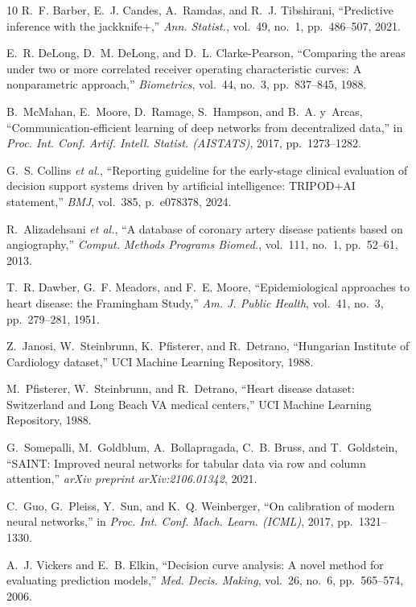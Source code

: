 \documentclass[journal]{IEEEtran}
\begin{document}
\begin{thebibliography}{10}
R.~F. Barber, E.~J. Candes, A.~Ramdas, and R.~J. Tibshirani, ``Predictive inference with the jackknife+,'' \textit{Ann. Statist.}, vol.~49, no.~1, pp.~486--507, 2021.

E.~R. DeLong, D.~M. DeLong, and D.~L. Clarke-Pearson, ``Comparing the areas under two or more correlated receiver operating characteristic curves: A nonparametric approach,'' \textit{Biometrics}, vol.~44, no.~3, pp.~837--845, 1988.

B.~McMahan, E.~Moore, D.~Ramage, S.~Hampson, and B.~A. y~Arcas, ``Communication-efficient learning of deep networks from decentralized data,'' in \textit{Proc. Int. Conf. Artif. Intell. Statist. (AISTATS)}, 2017, pp.~1273--1282.

G.~S. Collins \textit{et al.}, ``Reporting guideline for the early-stage clinical evaluation of decision support systems driven by artificial intelligence: TRIPOD+AI statement,'' \textit{BMJ}, vol.~385, p.~e078378, 2024.

R.~Alizadehsani \textit{et al.}, ``A database of coronary artery disease patients based on angiography,'' \textit{Comput. Methods Programs Biomed.}, vol.~111, no.~1, pp.~52--61, 2013.

T.~R. Dawber, G.~F. Meadors, and F.~E. Moore, ``Epidemiological approaches to heart disease: the Framingham Study,'' \textit{Am. J. Public Health}, vol.~41, no.~3, pp.~279--281, 1951.

Z.~Janosi, W.~Steinbrunn, K.~Pfisterer, and R.~Detrano, ``Hungarian Institute of Cardiology dataset,'' UCI Machine Learning Repository, 1988.

M.~Pfisterer, W.~Steinbrunn, and R.~Detrano, ``Heart disease dataset: Switzerland and Long Beach VA medical centers,'' UCI Machine Learning Repository, 1988.

G.~Somepalli, M.~Goldblum, A.~Bollapragada, C.~B. Bruss, and T.~Goldstein, ``SAINT: Improved neural networks for tabular data via row and column attention,'' \textit{arXiv preprint arXiv:2106.01342}, 2021.

C.~Guo, G.~Pleiss, Y.~Sun, and K.~Q. Weinberger, ``On calibration of modern neural networks,'' in \textit{Proc. Int. Conf. Mach. Learn. (ICML)}, 2017, pp.~1321--1330.

A.~J. Vickers and E.~B. Elkin, ``Decision curve analysis: A novel method for evaluating prediction models,'' \textit{Med. Decis. Making}, vol.~26, no.~6, pp.~565--574, 2006.

\end{thebibliography}
\end{document}
